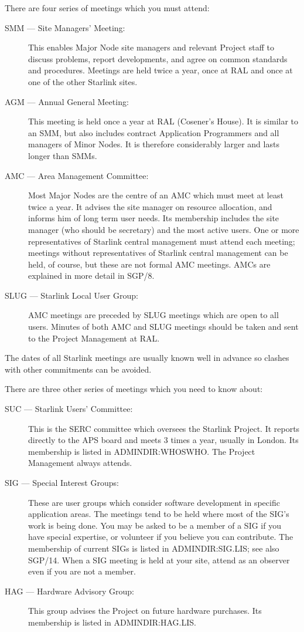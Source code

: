 There are four series of meetings which you must attend:
\begin{description}
\begin{description}
\item [SMM --- Site Managers' Meeting:]
This enables Major Node site managers and relevant Project staff to discuss
problems, report developments, and agree on common standards and procedures.
Meetings are held twice a year, once at RAL and once at one of the other
Starlink sites.
\item [AGM --- Annual General Meeting:]
This meeting is held once a year at RAL (Cosener's House).
It is similar to an SMM, but also includes contract Application Programmers and
all managers of Minor Nodes.
It is therefore considerably larger and lasts longer than SMMs.
\item [AMC --- Area Management Committee:]
Most Major Nodes are the centre of an AMC which must meet at least twice a year.
It advises the site manager on resource allocation, and informs him of long term
user needs.
Its membership includes the site manager (who should be secretary) and the most
active users.
One or more representatives of Starlink central management must attend each
meeting; meetings without representatives of Starlink central management can
be held, of course, but these are not formal AMC meetings.
AMCs are explained in more detail in SGP/8.  
\item [SLUG --- Starlink Local User Group:]
AMC meetings are preceded by SLUG meetings which are open to all users.
Minutes of both AMC and SLUG meetings should be taken and sent to the Project
Management at RAL.
\end{description}
\end{description}
The dates of all Starlink meetings are usually known well in advance so clashes
with other commitments can be avoided.
 
There are three other series of meetings which you need to know about:
\begin{description}
\begin{description}
\item [SUC --- Starlink Users' Committee:]
This is the SERC committee which oversees the Starlink Project.
It reports directly to the APS board and meets 3 times a year, usually in
London.
Its membership is listed in ADMINDIR:WHOSWHO.
The Project Management always attends.
\item [SIG --- Special Interest Groups:]
These are user groups which consider software development in specific
application areas.
The meetings tend to be held where most of the SIG's work is being done.
You may be asked to be a member of a SIG if you have special expertise,
or volunteer if you believe you can contribute.
The membership of current SIGs is listed in ADMINDIR:SIG.LIS; see also SGP/14.
When a SIG meeting is held at your site, attend as an observer even if you are
not a member.
\item [HAG --- Hardware Advisory Group:]
This group advises the Project on future hardware purchases.
Its membership is listed in ADMINDIR:HAG.LIS.
\end{description}
\end{description}

